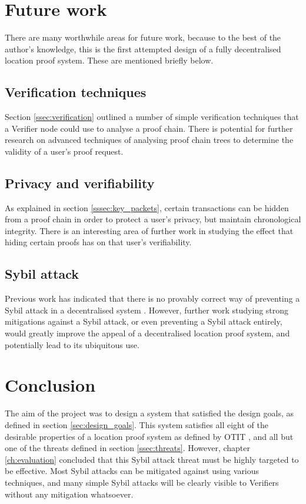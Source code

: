 \section{Future work}
There are many worthwhile areas for future work, because to the best of the author's knowledge, this is the first attempted design of a fully decentralised location proof system. These are mentioned briefly below.

\subsection{Verification techniques}
Section \ref{ssec:verification} outlined a number of simple verification techniques that a Verifier node could use to analyse a proof chain. There is potential for further research on advanced techniques of analysing proof chain trees to determine the validity of a user's proof request.

\subsection{Privacy and verifiability}
As explained in section \ref{sssec:key_packets}, certain transactions can be hidden from a proof chain in order to protect a user's privacy, but maintain chronological integrity. There is an interesting area of further work in studying the effect that hiding certain proofs has on that user's verifiability.

\subsection{Sybil attack}
Previous work has indicated that there is no provably correct way of preventing a Sybil attack in a decentralised system \cite{sybil}. However, further work studying strong mitigations against a Sybil attack, or even preventing a Sybil attack entirely, would greatly improve the appeal of a decentralised location proof system, and potentially lead to its ubiquitous use.

\section{Conclusion}
The aim of the project was to design a system that satisfied the design goals, as defined in section \ref{sec:design_goals}. This system satisfies all eight of the desirable properties of a location proof system as defined by OTIT \cite{otit}, and all but one of the threats defined in section \ref{ssec:threats}. However, chapter \ref{ch:evaluation} concluded that this Sybil attack threat must be highly targeted to be effective. Most Sybil attacks can be mitigated against using various techniques, and many simple Sybil attacks will be clearly visible to Verifiers without any mitigation whatsoever.

